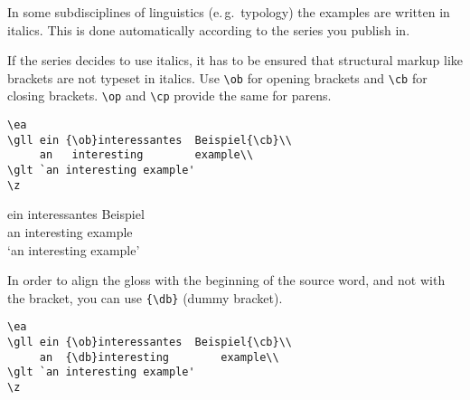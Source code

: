 % 


In some subdisciplines of linguistics (e.\,g.\ typology) the examples are written in italics.
This is done automatically according to the series you publish in. 

If the series decides to use italics, it has to be ensured that structural markup like brackets are not typeset in italics. Use \verb+\ob+ for opening brackets and \verb+\cb+ for closing brackets. \verb+\op+ and \verb+\cp+ provide the same for parens.
\begin{verbatim}
\ea
\gll ein {\ob}interessantes  Beispiel{\cb}\\
     an   interesting        example\\
\glt `an interesting example'
\z 
\end{verbatim}
\ea
\def\exfont{\normalsize\itshape}
\gll ein {\ob}interessantes       Beispiel{\cb}\\
     an   interesting example\\
\glt `an interesting example'
\z 
{}

In order to align the gloss with the beginning of the source word, and not with the bracket, you can use \verb+{\db}+ (dummy bracket).

\begin{verbatim}
\ea
\gll ein {\ob}interessantes  Beispiel{\cb}\\
     an  {\db}interesting        example\\
\glt `an interesting example'
\z 
\end{verbatim}

